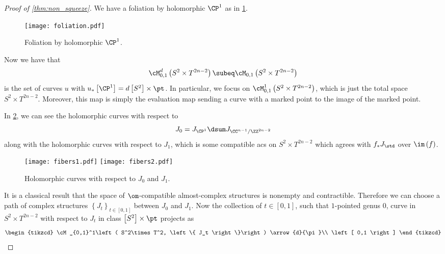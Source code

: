 \documentclass{amsart}
\begin{document}
\begin{proof}[Proof of \cref{thm:non_squeeze}]
We have a foliation by holomorphic $\CP^1$ as in \cref{fig:foliation}.
\begin{figure}
\texttt{[image: foliation.pdf]}
\caption{Foliation by holomorphic $\CP^1$.}
\label{fig:foliation}
\end{figure}

Now we have that
\begin{equation}
\cM_{0,1}^d\left( S^2 \times T^{2n-2} \right) \subeq
\cM_{0,1}\left( S^2 \times T^{2n-2} \right)
\end{equation}
is the set of curves $u$ with
$u_*\left[ \CP^1 \right] = d\left[ S^2 \right] \times \pt$.
In particular, we focus on $\cM_{0,1}^1\left( S^2 \times T^{2n-2} \right)$, 
which is just the total space
$S^2 \times T^{2n-2}$.
Moreover, this map is simply the evaluation map sending a curve
with a marked point to the image of the marked point.

In \cref{fig:fibers}, we can see the 
holomorphic curves with respect to
\begin{equation}
J_0 = J_{\CP^1} \dsum J_{\CC^{n-1} / \ZZ^{2n-2}}
\end{equation}
along with the holomorphic curves with respect to
$J_1$, which is some compatible acs on
$S^2 \times T^{2n-2}$ which agrees with $f_* J_\std$ over $\im \left( f \right)$.

\begin{figure}
\texttt{[image: fibers1.pdf]}
\texttt{[image: fibers2.pdf]}
\caption{Holomorphic curves with respect to $J_0$ and $J_1$.}
\label{fig:fibers}
\end{figure}

It is a classical result that the space of $\om$-compatible almost-complex
structures is nonempty and contractible.
Therefore we can choose a path of complex structures
$\left\{ J_t \right\}_{t\in \left[ 0,1 \right]}$ between $J_0$ and $J_1$.
Now the collection of $t\in \left[ 0,1 \right]$, such that $1$-pointed
genus $0$, curve in $S^2 \times T^{2n-2}$ with respect to $J_t$
in class $\left[ S^2 \right] \times \pt$ projects as
\begin{equation}
\begin{tikzcd}
\cM_{0,1}^1\left( S^2\times T^2, \left\{ J_t \right\}\right)
\arrow{d}{\pi}\\
\left[ 0,1 \right]
\end{tikzcd}
\end{equation}


\end{proof}
\end{document}
